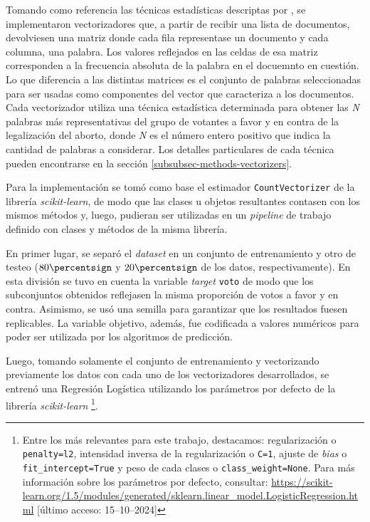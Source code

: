 Tomando como referencia las t\'ecnicas estad\'isticas descriptas por
\cite{monroe2008fightin}, se implementaron vectorizadores que, a partir de
recibir una lista de documentos, devolviesen una matriz donde cada fila
representase un documento y cada columna, una palabra. Los valores
reflejados en las celdas de esa matriz corresponden a la frecuencia absoluta
de la palabra en el docuemnto en cuesti\'on. Lo que diferencia a
las distintas matrices es el conjunto de palabras seleccionadas
para ser usadas como componentes del vector
que caracteriza a los documentos. Cada vectorizador utiliza
una t\'ecnica estad\'istica determinada para obtener las \textit{N}
palabras m\'as representativas del grupo de votantes a favor y
en contra de la legalizaci\'on del aborto, donde \textit{N} es el n\'umero
entero positivo que indica la cantidad de palabras a considerar.
Los detalles particulares de cada
t\'ecnica pueden encontrarse en la secci\'on \ref{subsubsec-methods-vectorizers}.
\par
Para la implementaci\'on se tom\'o como base el estimador \texttt{CountVectorizer}
de la librer\'ia \textit{scikit-learn}, de modo que las clases u objetos resultantes
contasen con los mismos m\'etodos y, luego, pudieran ser utilizadas en un
\textit{pipeline}
de trabajo definido con clases y m\'etodos de la misma librer\'ia.
\par
En primer lugar, se separ\'o el \textit{dataset} en un conjunto de entrenamiento
y otro de testeo ($80\percentsign$ y $20\percentsign$ de los datos, respectivamente).
En esta divisi\'on se tuvo en cuenta la variable \textit{target} \texttt{voto} de modo
que los subconjuntos obtenidos reflejasen la misma proporci\'on de votos a favor
y en contra. Asimismo, se us\'o una semilla para garantizar que los resultados
fuesen replicables. La variable objetivo, adem\'as, fue codificada a valores
num\'ericos para poder ser utilizada por los algoritmos de predicci\'on.
\par
Luego, tomando solamente el conjunto de entrenamiento y vectorizando
previamente los datos con cada uno de los vectorizadores desarrollados,
se entren\'o una Regresi\'on Log\'istica utilizando los par\'ametros por defecto
de la librer\'ia \textit{scikit-learn}
\footnote{Entre los m\'as relevantes para este trabajo, destacamos: regularizaci\'on
o \texttt{penalty=l2}, intensidad inversa de la regularizaci\'on o \texttt{C=1},
ajuste de \textit{bias} o \texttt{fit\_intercept=True} y peso de cada clases
o \texttt{class\_weight=None}.
Para m\'as informaci\'on sobre los par\'ametros por defecto, consultar:
\url{https://scikit-learn.org/1.5/modules/generated/sklearn.linear_model.LogisticRegression.html} [\'ultimo acceso: 15--10--2024]}.
